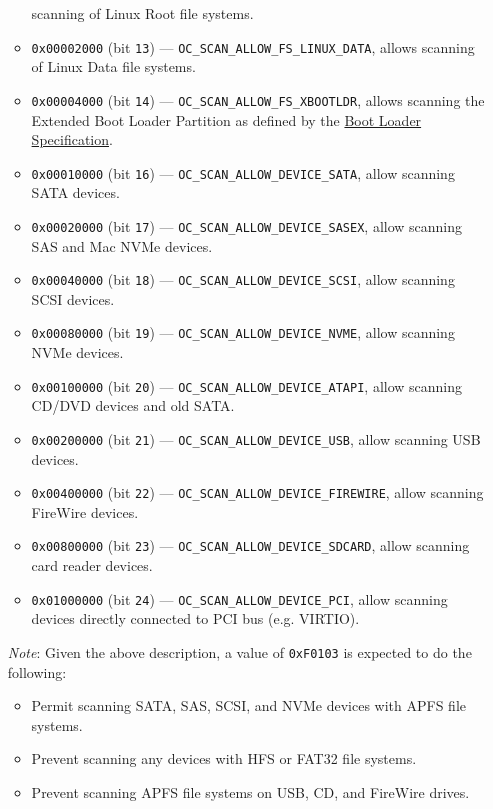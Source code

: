 \documentclass[]{article}
\providecommand{\tightlist}{%
  \setlength{\itemsep}{0pt}\setlength{\parskip}{0pt}}
\begin{document}
\begin{enumerate}
\begin{itemize}
    scanning of Linux Root file systems.
    \item \texttt{0x00002000} (bit \texttt{13}) --- \texttt{OC\_SCAN\_ALLOW\_FS\_LINUX\_DATA}, allows
    scanning of Linux Data file systems.
    \item \texttt{0x00004000} (bit \texttt{14}) --- \texttt{OC\_SCAN\_ALLOW\_FS\_XBOOTLDR}, allows
    scanning the Extended Boot Loader Partition as defined by the
    \href{https://systemd.io/BOOT\_LOADER\_SPECIFICATION/}{Boot Loader Specification}.
    \item \texttt{0x00010000} (bit \texttt{16}) --- \texttt{OC\_SCAN\_ALLOW\_DEVICE\_SATA}, allow
    scanning SATA devices.
    \item \texttt{0x00020000} (bit \texttt{17}) --- \texttt{OC\_SCAN\_ALLOW\_DEVICE\_SASEX}, allow
    scanning SAS and Mac NVMe devices.
    \item \texttt{0x00040000} (bit \texttt{18}) --- \texttt{OC\_SCAN\_ALLOW\_DEVICE\_SCSI}, allow
    scanning SCSI devices.
    \item \texttt{0x00080000} (bit \texttt{19}) --- \texttt{OC\_SCAN\_ALLOW\_DEVICE\_NVME}, allow
    scanning NVMe devices.
    \item \texttt{0x00100000} (bit \texttt{20}) --- \texttt{OC\_SCAN\_ALLOW\_DEVICE\_ATAPI}, allow
    scanning CD/DVD devices and old SATA.
    \item \texttt{0x00200000} (bit \texttt{21}) --- \texttt{OC\_SCAN\_ALLOW\_DEVICE\_USB}, allow
    scanning USB devices.
    \item \texttt{0x00400000} (bit \texttt{22}) --- \texttt{OC\_SCAN\_ALLOW\_DEVICE\_FIREWIRE}, allow
    scanning FireWire devices.
    \item \texttt{0x00800000} (bit \texttt{23}) --- \texttt{OC\_SCAN\_ALLOW\_DEVICE\_SDCARD}, allow
    scanning card reader devices.
    \item \texttt{0x01000000} (bit \texttt{24}) --- \texttt{OC\_SCAN\_ALLOW\_DEVICE\_PCI}, allow
    scanning devices directly connected to PCI bus (e.g. VIRTIO).
  \end{itemize}

  \emph{Note}: Given the above description, a value of \texttt{0xF0103} is expected to do the following:

  \begin{itemize}
  \tightlist
  \item Permit scanning SATA, SAS, SCSI, and NVMe devices with APFS file systems.
  \item Prevent scanning any devices with HFS or FAT32 file systems.
  \item Prevent scanning APFS file systems on USB, CD, and FireWire drives.
  \end{itemize}


\end{enumerate}
\end{document}
